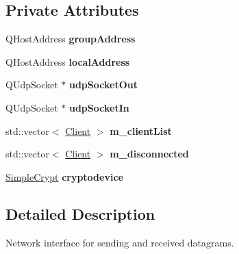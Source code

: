 \subsection*{Private Attributes}
\begin{DoxyCompactItemize}
\item 
\hypertarget{class_network_listener_a4283b85857436ac617eeb4c93fdf11ac}{}Q\+Host\+Address {\bfseries group\+Address}\label{class_network_listener_a4283b85857436ac617eeb4c93fdf11ac}

\item 
\hypertarget{class_network_listener_a9941fd48019abc42514df6b204228b74}{}Q\+Host\+Address {\bfseries local\+Address}\label{class_network_listener_a9941fd48019abc42514df6b204228b74}

\item 
\hypertarget{class_network_listener_adaba275a4d4b8bd16506f13f95b1575a}{}Q\+Udp\+Socket $\ast$ {\bfseries udp\+Socket\+Out}\label{class_network_listener_adaba275a4d4b8bd16506f13f95b1575a}

\item 
\hypertarget{class_network_listener_a5209ce2c1fcde559cd7bb499582bc31c}{}Q\+Udp\+Socket $\ast$ {\bfseries udp\+Socket\+In}\label{class_network_listener_a5209ce2c1fcde559cd7bb499582bc31c}

\item 
\hypertarget{class_network_listener_ad9e784d4d6f035ecc02d4b47368e727f}{}std\+::vector$<$ \hyperlink{struct_client}{Client} $>$ {\bfseries m\+\_\+client\+List}\label{class_network_listener_ad9e784d4d6f035ecc02d4b47368e727f}

\item 
\hypertarget{class_network_listener_aa22cfac015aabb913b1e91410a57c7c8}{}std\+::vector$<$ \hyperlink{struct_client}{Client} $>$ {\bfseries m\+\_\+disconnected}\label{class_network_listener_aa22cfac015aabb913b1e91410a57c7c8}

\item 
\hypertarget{class_network_listener_adb41464b0923c725f94001b73e51a820}{}\hyperlink{class_simple_crypt}{Simple\+Crypt} {\bfseries cryptodevice}\label{class_network_listener_adb41464b0923c725f94001b73e51a820}

\end{DoxyCompactItemize}


\subsection{Detailed Description}
Network interface for sending and received datagrams. 

